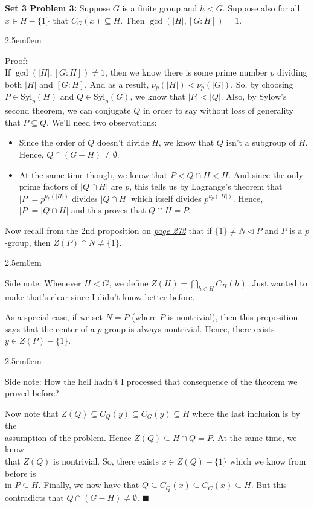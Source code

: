 \documentclass{book}
\newcommand{\inLinkRap}[2]{{\color{blue}\hyperlink{#1}{\textit{#2}}}}
\newcommand{\exPPP}{%
   \color{VioletRed}%
   \fontsize{12}{14}\selectfont%
}
\newcommand{\Hstatement}{%
   \color{MidnightBlue!90!Black}%
   \fontsize{12}{13}\selectfont%
}
\newcommand{\HexOne}{%
   \color{Purple}%
   \fontsize{12}{13}\selectfont%
}
\newenvironment{myIndent}{%
   \begin{adjustwidth}{2.5em}{0em}%
}{%
   \end{adjustwidth}%
}
\newcommand{\blab}[1]{\textbf{#1}}
\newcommand{\Syl}{\mathrm{Syl}}
\newcommand{\retTwo}{\hfill\bigbreak}
\begin{document}
\Hstatement\blab{Set 3 Problem 3:} Suppose $G$ is a finite group and $h < G$. Suppose also for all $x \in H - \{1\}$ that $C_G(x) \subseteq H$. Then $\gcd(|H|, [G : H]) = 1$.
\begin{myIndent}\HexOne
	Proof:\\
	If $\gcd(|H|, [G : H]) \neq 1$, then we know there is some prime number $p$ dividing both $|H|$ and $[G : H]$. And as a result, $\nu_p(|H|) < \nu_p(|G|)$. So, by choosing $P \in \Syl_p(H)$ and $Q \in \Syl_p(G)$, we know that $|P| < |Q|$. Also, by Sylow's second theorem, we can conjugate $Q$ in order to say without loss of generality that $P \subseteq Q$. We'll need two observations:
	\begin{itemize}
		\item Since the order of $Q$ doesn't divide $H$, we know that $Q$ isn't a subgroup of $H$. Hence, $Q \cap (G - H) \neq \emptyset$.
		\item At the same time though, we know that $P < Q \cap H < H$. And since the only prime factors of $|Q \cap H|$ are $p$, this tells us by Lagrange's theorem that $|P| = p^{\nu_p(|H|)}$ divides $|Q \cap H|$ which itself divides $p^{\nu_p(|H|)}$. Hence, $|P| = |Q \cap H|$ and this proves that $Q \cap H = P$. \retTwo
	\end{itemize}

	Now recall from the 2nd proposition on \inLinkRap{Alireza theorem center of p groups}{page 272} that if $\{1\} \neq N \lhd P$ and $P$ is a $p$-group, then $Z(P) \cap N \neq \{1\}$.
	\begin{myIndent}\exPPP
		Side note: Whenever $H < G$, we define $Z(H) = \bigcap_{h \in H}C_H(h)$. Just wanted to make that's clear since I didn't know better before.\retTwo
	\end{myIndent}

	As a special case, if we set $N = P$ (where $P$ is nontrivial), then this proposition says that the center of a $p$-group is always nontrivial. Hence, there exists $y \in Z(P) - \{1\}$.
	\begin{myIndent}\exPPP
		Side note: How the hell hadn't I processed that consequence of the theorem we\\ proved before?\retTwo
	\end{myIndent}

	Now note that $Z(Q) \subseteq C_Q(y) \subseteq C_G(y) \subseteq H$ where the last inclusion is by the\\ assumption of the problem. Hence $Z(Q) \subseteq H \cap Q = P$. At the same time, we know\\ that $Z(Q)$ is nontrivial. So, there exists $x \in Z(Q) - \{1\}$ which we know from before is\\ in $P \subseteq H$. Finally, we now have that $Q \subseteq C_Q(x) \subseteq C_G(x) \subseteq H$. But this contradicts that $Q \cap (G - H) \neq \emptyset$. $\blacksquare$\retTwo
\end{myIndent}
\end{document}
